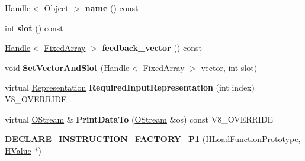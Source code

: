 \begin{DoxyCompactItemize}
\item 
\hypertarget{classv8_1_1internal_1_1_v8___f_i_n_a_l_aa83a002fe4507ecd54cfece547c30295}{}\hyperlink{classv8_1_1internal_1_1_handle}{Handle}$<$ \hyperlink{classv8_1_1internal_1_1_object}{Object} $>$ {\bfseries name} () const \label{classv8_1_1internal_1_1_v8___f_i_n_a_l_aa83a002fe4507ecd54cfece547c30295}

\item 
\hypertarget{classv8_1_1internal_1_1_v8___f_i_n_a_l_ab2e2be77bd895fae71de18a24a557643}{}int {\bfseries slot} () const \label{classv8_1_1internal_1_1_v8___f_i_n_a_l_ab2e2be77bd895fae71de18a24a557643}

\item 
\hypertarget{classv8_1_1internal_1_1_v8___f_i_n_a_l_a9db8e7d077e3e906a25da2747defc827}{}\hyperlink{classv8_1_1internal_1_1_handle}{Handle}$<$ \hyperlink{classv8_1_1internal_1_1_fixed_array}{Fixed\+Array} $>$ {\bfseries feedback\+\_\+vector} () const \label{classv8_1_1internal_1_1_v8___f_i_n_a_l_a9db8e7d077e3e906a25da2747defc827}

\item 
\hypertarget{classv8_1_1internal_1_1_v8___f_i_n_a_l_a7a756c295327d9268449fa3c63e659cc}{}void {\bfseries Set\+Vector\+And\+Slot} (\hyperlink{classv8_1_1internal_1_1_handle}{Handle}$<$ \hyperlink{classv8_1_1internal_1_1_fixed_array}{Fixed\+Array} $>$ vector, int slot)\label{classv8_1_1internal_1_1_v8___f_i_n_a_l_a7a756c295327d9268449fa3c63e659cc}

\item 
\hypertarget{classv8_1_1internal_1_1_v8___f_i_n_a_l_a6c6d1f37f40b113d8f4062f1ffff7215}{}virtual \hyperlink{classv8_1_1internal_1_1_representation}{Representation} {\bfseries Required\+Input\+Representation} (int index) V8\+\_\+\+O\+V\+E\+R\+R\+I\+D\+E\label{classv8_1_1internal_1_1_v8___f_i_n_a_l_a6c6d1f37f40b113d8f4062f1ffff7215}

\item 
\hypertarget{classv8_1_1internal_1_1_v8___f_i_n_a_l_ac450dad970b14246be761ccf5004924b}{}virtual \hyperlink{classv8_1_1internal_1_1_o_stream}{O\+Stream} \& {\bfseries Print\+Data\+To} (\hyperlink{classv8_1_1internal_1_1_o_stream}{O\+Stream} \&os) const V8\+\_\+\+O\+V\+E\+R\+R\+I\+D\+E\label{classv8_1_1internal_1_1_v8___f_i_n_a_l_ac450dad970b14246be761ccf5004924b}

\item 
\hypertarget{classv8_1_1internal_1_1_v8___f_i_n_a_l_a7b34409ac554b2a064c8b5d0f6e340e1}{}{\bfseries D\+E\+C\+L\+A\+R\+E\+\_\+\+I\+N\+S\+T\+R\+U\+C\+T\+I\+O\+N\+\_\+\+F\+A\+C\+T\+O\+R\+Y\+\_\+\+P1} (H\+Load\+Function\+Prototype, \hyperlink{classv8_1_1internal_1_1_h_value}{H\+Value} $\ast$)\label{classv8_1_1internal_1_1_v8___f_i_n_a_l_a7b34409ac554b2a064c8b5d0f6e340e1}


\end{DoxyCompactItemize}
